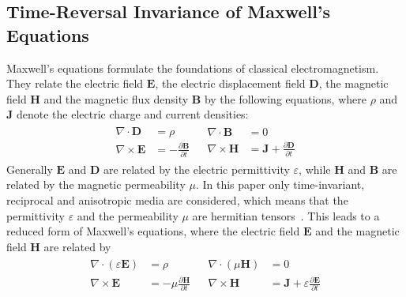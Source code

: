 \subsection{Time-Reversal Invariance of Maxwell's Equations}
Maxwell's equations formulate the foundations of classical electromagnetism.
They relate the electric field \(\bm{E}\), the electric displacement field \(\bm{D}\), the magnetic field \(\bm{H}\) and the magnetic flux density \(\bm{B}\)  by the following equations, where \(\rho \) and \({\bm{J}}\) denote the electric charge and current densities:
\begin{align}
    \begin{split}
        \nabla \cdot \bm{D} &= \rho \\
        \nabla \times \bm{E} &= -\frac{\partial \bm{B}}{\partial t}
    \end{split}
    &
    \begin{split}
        \nabla \cdot \bm{B} &= 0 \\
        \nabla \times \bm{H} &= \bm{J} + \frac{\partial \bm{D}}{\partial t}
    \end{split}
\end{align}
Generally \(\bm{E}\) and \(\bm{D}\) are related by the electric permittivity \(\varepsilon \), while \(\bm{H}\) and \(\bm{B}\) are related by the magnetic permeability \(\mu \).
In this paper only time-invariant, reciprocal and anisotropic media are considered, which means that the permittivity \(\varepsilon \) and the permeability \(\mu \) are hermitian tensors~\parencite{krowne_electromagnetic_1984}.
This leads to a reduced form of Maxwell's equations, where the electric field \(\bm{E}\) and the magnetic field \(\bm{H}\) are related by
\begin{align}
    \begin{split}
        \nabla \cdot (\varepsilon \bm{E}) &= \rho \\
        \nabla \times \bm{E} &= -\mu \frac{\partial \bm{H}}{\partial t}
    \end{split}
    &
    \begin{split}
        \nabla \cdot (\mu \bm{H}) &= 0 \\
        \nabla \times \bm{H} &= \bm{J} + \varepsilon \frac{\partial \bm{E}}{\partial t}
    \end{split}
\end{align}

